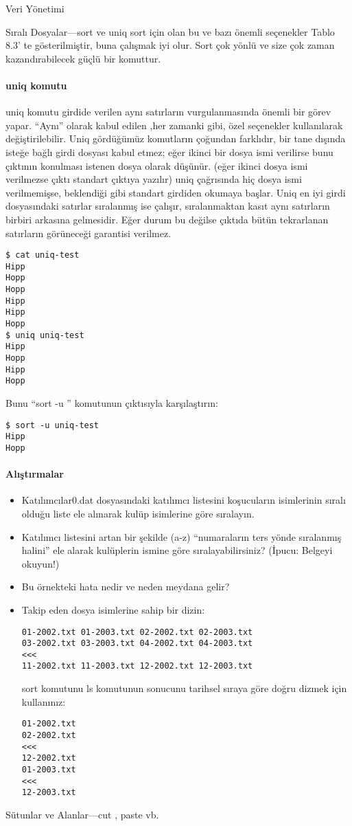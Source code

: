 \begin{section}{Veri Yönetimi}
\begin{subsection}{Sıralı Dosyalar—sort ve uniq}
sort için olan bu ve bazı önemli seçenekler Tablo 8.3' te gösterilmiştir, buna çalışmak iyi olur. Sort çok yönlü ve size çok zaman kazandırabilecek güçlü bir komuttur.
\paragraph{uniq komutu}{uniq komutu girdide verilen aynı satırların vurgulanmasında önemli bir görev yapar.  “Aynı” olarak kabul edilen ,her zamanki gibi, özel seçenekler kullanılarak değiştirilebilir. Uniq gördüğümüz komutların çoğundan farklıdır, bir tane dışında isteğe bağlı girdi dosyası kabul etmez; eğer ikinci bir dosya ismi verilirse bunu çıktının konulması istenen dosya olarak düşünür. (eğer ikinci dosya ismi verilmezse çıktı standart çıktıya yazılır) uniq çağrısında hiç dosya ismi verilmemişse, beklendiği gibi standart girdiden okumaya başlar. Uniq en iyi girdi dosyasındaki satırlar sıralanmış ise çalışır, sıralanmaktan kasıt aynı satırların birbiri arkasına gelmesidir. Eğer durum bu değilse çıktıda bütün tekrarlanan satırların görüneceği garantisi verilmez.}
\begin{verbatim}
$ cat uniq-test
Hipp
Hopp
Hopp
Hipp
Hipp
Hopp
$ uniq uniq-test
Hipp
Hopp
Hipp
Hopp
\end{verbatim}

Bunu “sort -u ” komutunun çıktısıyla karşılaştırın:
\begin{verbatim}
$ sort -u uniq-test
Hipp
Hopp
\end{verbatim}

\paragraph{Alıştırmalar}{
\begin{itemize}
 \item Katılımcılar0.dat dosyasındaki katılımcı listesini koşucuların isimlerinin sıralı olduğu liste ele alınarak kulüp isimlerine göre sıralayın.
 \item Katılımcı listesini artan bir şekilde (a-z) “numaraların ters yönde sıralanmış halini” ele alarak kulüplerin ismine göre sıralayabilirsiniz? (İpucu: Belgeyi okuyun!)
 \item Bu örnekteki hata nedir ve neden meydana gelir?
 \item Takip eden dosya isimlerine sahip bir dizin: 
 \begin{verbatim}
01-2002.txt 01-2003.txt 02-2002.txt 02-2003.txt
03-2002.txt 03-2003.txt 04-2002.txt 04-2003.txt
<<<
11-2002.txt 11-2003.txt 12-2002.txt 12-2003.txt
 \end{verbatim}
 sort komutunu ls komutunun sonucunu tarihsel sıraya göre doğru dizmek için kullanınız:
 \begin{verbatim}
01-2002.txt
02-2002.txt
<<<
12-2002.txt
01-2003.txt
<<<
12-2003.txt
 \end{verbatim}
\end{itemize}}
\end{subsection}
\begin{subsection}{Sütunlar ve Alanlar—cut , paste vb.}


\end{subsection}
\end{section}
